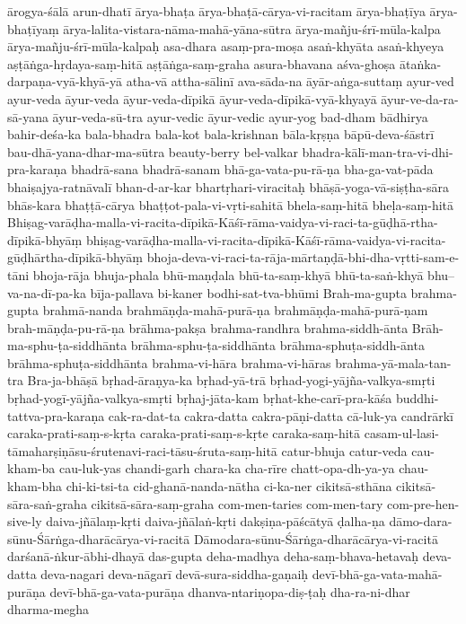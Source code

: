 {ārogya-śālā
arun-dhatī
ārya-bhaṭa
ārya-bhaṭā-cārya-vi-racitam
ārya-bhaṭīya
ārya-bhaṭīyaṃ
ārya-lalita-vistara-nāma-mahā-yāna-sūtra
ārya-mañju-śrī-mūla-kalpa
ārya-mañju-śrī-mūla-kalpaḥ
asa-dhara
asaṃ-pra-moṣa
asaṅ-khyāta
asaṅ-khyeya
aṣṭāṅga-hṛdaya-saṃ-hitā
aṣṭāṅga-saṃ-graha
asura-bhavana
aśva-ghoṣa
ātaṅka-darpaṇa-vyā-khyā-yā
atha-vā
attha-sālinī
ava-sāda-na
āyār-aṅga-suttaṃ
ayur-ved
ayur-veda
āyur-veda
āyur-veda-dīpikā
āyur-veda-dīpikā-vyā-khyayā
āyur-ve-da-ra-sā-yana
āyur-veda-sū-tra
ayur-vedic
āyur-vedic
ayur-yog
bad-dham
bādhirya
bahir-deśa-ka
bala-bhadra
bala-kot
bala-krishnan
bāla-kṛṣṇa
bāpū-deva-śāstrī
bau-dhā-yana-dhar-ma-sūtra
beauty-berry
bel-valkar
bhadra-kālī-man-tra-vi-dhi-pra-karaṇa
bhadrā-sana
bhadrā-sanam
bhā-ga-vata-pu-rā-ṇa
bha-ga-vat-pāda
bhaiṣajya-ratnāvalī
bhan-d-ar-kar
bhartṛhari-viracitaḥ
bhāṣā-yoga-vā-siṣṭha-sāra
bhās-kara
bhaṭṭā-cārya
bhaṭṭot-pala-vi-vṛti-sahitā
bhela-saṃ-hitā
bheḷa-saṃ-hitā
Bhiṣag-varāḍha-malla-vi-racita-dīpikā-Kāśī-rāma-vaidya-vi-raci-ta-gūḍhā-rtha-dīpikā-bhyāṃ
bhiṣag-varāḍha-malla-vi-racita-dīpikā-Kāśī-rāma-vaidya-vi-racita-gūḍhārtha-dīpikā-bhyāṃ
bhoja-deva-vi-raci-ta-rāja-mārtaṇḍā-bhi-dha-vṛtti-sam-e-tāni
bhoja-rāja
bhuja-phala
bhū-maṇḍala
bhū-ta-saṃ-khyā
bhū-ta-saṅ-khyā
bhu--va-na-dī-pa-ka
bīja-pallava
bi-kaner
bodhi-sat-tva-bhūmi
Brah-ma-gupta
brahma-gupta
brahmā-nanda
brahmāṇḍa-mahā-purā-ṇa
brahmāṇḍa-mahā-purā-ṇam
brah-māṇḍa-pu-rā-ṇa
brāhma-pakṣa
brahma-randhra
brahma-siddh-ānta
Brāh-ma-sphu-ṭa-siddhānta
brāhma-sphu-ṭa-siddhānta
brāhma-sphuṭa-siddh-ānta
brāhma-sphuṭa-siddhānta
brahma-vi-hāra
brahma-vi-hāras
brahma-yā-mala-tan-tra
Bra-ja-bhāṣā
bṛhad-āraṇya-ka
bṛhad-yā-trā
bṛhad-yogi-yājña-valkya-smṛti
bṛhad-yogī-yājña-valkya-smṛti
bṛhaj-jāta-kam
bṛhat-khe-carī-pra-kāśa
buddhi-tattva-pra-karaṇa
cak-ra-dat-ta
cakra-datta
cakra-pāṇi-datta
cā-luk-ya
candrārkī
caraka-prati-saṃ-s-kṛta
caraka-prati-saṃ-s-kṛte
caraka-saṃ-hitā
casam-ul-lasi-tāmaharṣiṇāsu-śrutenavi-raci-tāsu-śruta-saṃ-hitā
catur-bhuja
catur-veda
cau-kham-ba
cau-luk-yas
chandi-garh
chara-ka
cha-rīre
chatt-opa-dh-ya-ya
chau-kham-bha
chi-ki-tsi-ta
cid-ghanā-nanda-nātha
ci-ka-ner
cikitsā-sthāna
cikitsā-sāra-saṅ-graha cikitsā-sāra-saṃ-graha
com-men-taries
com-men-tary
com-pre-hen-sive-ly
daiva-jñālaṃ-kṛti
daiva-jñālaṅ-kṛti
dakṣiṇa-pāścātyā
ḍalha-ṇa
dāmo-dara-sūnu-Śārṅga-dharācārya-vi-racitā
Dāmodara-sūnu-Śārṅga-dharācārya-vi-racitā
darśanā-ṅkur-ābhi-dhayā
das-gupta
deha-madhya
deha-saṃ-bhava-hetavaḥ
deva-datta
deva-nagari
deva-nāgarī
devā-sura-siddha-gaṇaiḥ
devī-bhā-ga-vata-mahā-purāṇa
devī-bhā-ga-vata-purāṇa
dhanva-ntariṇopa-diṣ-ṭaḥ
dha-ra-ni-dhar
dharma-megha
}
